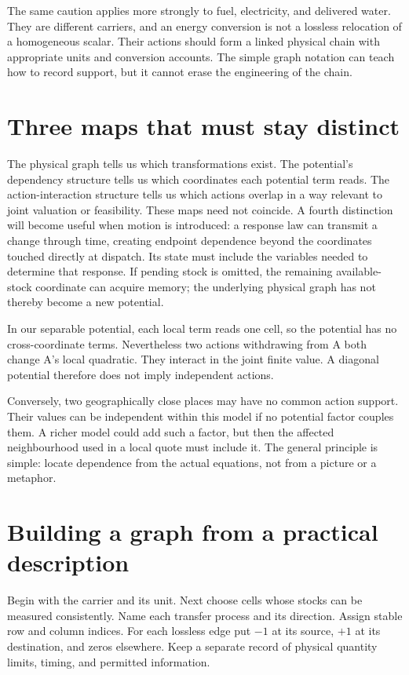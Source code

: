 The same caution applies more strongly to fuel, electricity, and delivered water. They are different carriers, and an energy conversion is not a lossless relocation of a homogeneous scalar. Their actions should form a linked physical chain with appropriate units and conversion accounts. The simple graph notation can teach how to record support, but it cannot erase the engineering of the chain.

\section{Three maps that must stay distinct}
The physical graph tells us which transformations exist. The potential's dependency structure tells us which coordinates each potential term reads. The action-interaction structure tells us which actions overlap in a way relevant to joint valuation or feasibility. These maps need not coincide. A fourth distinction will become useful when motion is introduced: a response law can transmit a change through time, creating endpoint dependence beyond the coordinates touched directly at dispatch. Its state must include the variables needed to determine that response. If pending stock is omitted, the remaining available-stock coordinate can acquire memory; the underlying physical graph has not thereby become a new potential.

In our separable potential, each local term reads one cell, so the potential has no cross-coordinate terms. Nevertheless two actions withdrawing from A both change A's local quadratic. They interact in the joint finite value. A diagonal potential therefore does not imply independent actions.

Conversely, two geographically close places may have no common action support. Their values can be independent within this model if no potential factor couples them. A richer model could add such a factor, but then the affected neighbourhood used in a local quote must include it. The general principle is simple: locate dependence from the actual equations, not from a picture or a metaphor.

\section{Building a graph from a practical description}
Begin with the carrier and its unit. Next choose cells whose stocks can be measured consistently. Name each transfer process and its direction. Assign stable row and column indices. For each lossless edge put \(-1\) at its source, \(+1\) at its destination, and zeros elsewhere. Keep a separate record of physical quantity limits, timing, and permitted information.

